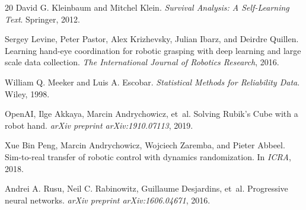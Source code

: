 \documentclass{article}
\begin{document}
\begin{thebibliography}{20}
David G. Kleinbaum and Mitchel Klein. \emph{Survival Analysis: A Self-Learning
Text}. Springer, 2012.

Sergey Levine, Peter Pastor, Alex Krizhevsky, Julian Ibarz, and Deirdre Quillen.
Learning hand-eye coordination for robotic grasping with deep learning and large
scale data collection. \emph{The International Journal of Robotics Research},
2016.

William Q. Meeker and Luis A. Escobar. \emph{Statistical Methods for Reliability
Data}. Wiley, 1998.

OpenAI, Ilge Akkaya, Marcin Andrychowicz, et~al. Solving Rubik's Cube with a
robot hand. \emph{arXiv preprint arXiv:1910.07113}, 2019.

Xue Bin Peng, Marcin Andrychowicz, Wojciech Zaremba, and Pieter Abbeel.
Sim-to-real transfer of robotic control with dynamics randomization. In
\emph{ICRA}, 2018.

Andrei A. Rusu, Neil C. Rabinowitz, Guillaume Desjardins, et~al. Progressive
neural networks. \emph{arXiv preprint arXiv:1606.04671}, 2016.
\end{thebibliography}
\end{document}
